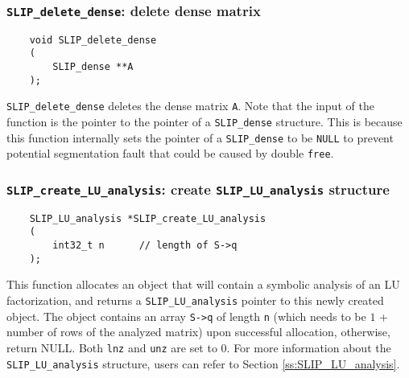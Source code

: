 \documentclass[11pt]{article}
\theoremstyle{definition}
\begin{document}
\cprotect\subsubsection{\verb|SLIP_delete_dense|: delete dense matrix}
\label{ss:delete_dense}

\begin{mdframed}[userdefinedwidth=6in]
{\footnotesize
\begin{verbatim}
    void SLIP_delete_dense
    (
        SLIP_dense **A
    );
\end{verbatim}
} \end{mdframed}

\verb|SLIP_delete_dense| deletes the dense matrix \verb|A|. Note that the input
of the function is the pointer to the pointer of a \verb|SLIP_dense| structure.
This is because this function internally sets the pointer of a
\verb|SLIP_dense| to be \verb|NULL| to prevent potential segmentation fault
that could be caused by double \verb|free|.

\cprotect\subsubsection{\verb|SLIP_create_LU_analysis|: create \verb|SLIP_LU_analysis| structure}
\label{ss:create_LU_analysis}

\begin{mdframed}[userdefinedwidth=6in]
{\footnotesize
\begin{verbatim}
    SLIP_LU_analysis *SLIP_create_LU_analysis
    (
        int32_t n      // length of S->q
    );
\end{verbatim}
} \end{mdframed}

This function allocates an object that will contain a symbolic analysis of an
LU factorization, and returns a \verb|SLIP_LU_analysis| pointer to this newly
created object.  The object contains an array \verb|S->q| of length \verb|n|
(which needs to be $1$ + number of rows of the analyzed matrix) upon successful
allocation, otherwise, return NULL. Both \verb|lnz| and \verb|unz| are set to
0. For more information about the \verb|SLIP_LU_analysis| structure, users can
refer to Section \ref{ss:SLIP_LU_analysis}.
\end{document}
